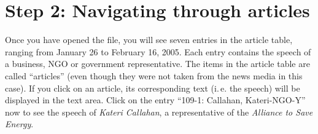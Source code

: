 \documentclass[12pt,a4paper]{scrreprt}
\begin{document}
\section*{Step 2: Navigating through articles}
Once you have opened the file, you will see seven entries in the article table, ranging from January 26 to February 16, 2005. Each entry contains the speech of a business, NGO or government representative. The items in the article table are called ``articles'' (even though they were not taken from the news media in this case). If you click on an article, its corresponding text (i.\,e. the speech) will be displayed in the text area. Click on the entry ``109-1: Callahan, Kateri-NGO-Y'' now to see the speech of \emph{Kateri Callahan}, a representative of the \emph{Alliance to Save Energy}.
\end{document}
